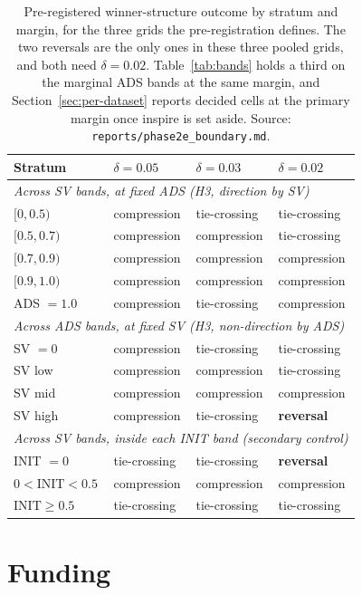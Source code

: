 \documentclass[11pt]{article}
\begin{document}
\begin{table}[htbp]
\centering
\caption{Pre-registered winner-structure outcome by stratum and margin, for the
three grids the pre-registration defines. The two reversals are the only ones
in these three pooled grids, and both need $\delta = 0.02$.
Table~\ref{tab:bands} holds a third on the marginal ADS bands at the same
margin, and Section~\ref{sec:per-dataset} reports decided cells at the primary
margin once inspire is set aside. Source: \texttt{reports/phase2e\_boundary.md}.}
\label{tab:margingrid}
\small
\begin{tabular}{llll}
\toprule
Stratum & $\delta = 0.05$ & $\delta = 0.03$ & $\delta = 0.02$ \\
\midrule
\multicolumn{4}{l}{\emph{Across SV bands, at fixed ADS (H3, direction by SV)}} \\
$[0, 0.5)$ & compression & tie-crossing & tie-crossing \\
$[0.5, 0.7)$ & compression & compression & tie-crossing \\
$[0.7, 0.9)$ & compression & compression & compression \\
$[0.9, 1.0)$ & compression & compression & compression \\
ADS $= 1.0$ & compression & tie-crossing & compression \\
\midrule
\multicolumn{4}{l}{\emph{Across ADS bands, at fixed SV (H3, non-direction by ADS)}} \\
SV $= 0$ & compression & tie-crossing & tie-crossing \\
SV low & compression & compression & tie-crossing \\
SV mid & compression & compression & compression \\
SV high & compression & tie-crossing & \textbf{reversal} \\
\midrule
\multicolumn{4}{l}{\emph{Across SV bands, inside each INIT band (secondary control)}} \\
INIT $= 0$ & tie-crossing & tie-crossing & \textbf{reversal} \\
$0 < \mathrm{INIT} < 0.5$ & compression & compression & compression \\
$\mathrm{INIT} \geq 0.5$ & tie-crossing & tie-crossing & tie-crossing \\
\bottomrule
\end{tabular}
\end{table}

\section*{Funding}
\end{document}
